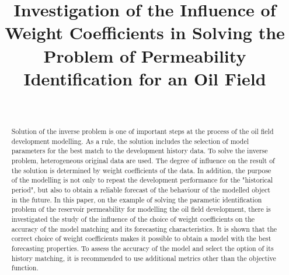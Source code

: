 \documentclass[
11pt,%
tightenlines,%
twoside,%
onecolumn,%
nofloats,%
nobibnotes,%
nofootinbib,%
superscriptaddress,%
noshowpacs,%
centertags]%
{revtex4}
\begin{document}

\title{Investigation of the Influence of Weight Coefficients in Solving
the Problem of Permeability Identification for an Oil Field}

\author{~}
 






\begin{abstract} %
Solution of the inverse problem is one of important steps at the process of the oil field development modelling. As a rule, the solution includes the selection of model parameters for the best match to the development history data. To solve the inverse problem, heterogeneous original data are used. The degree of influence on the result of the solution is determined by weight coefficients of the data. In addition, the purpose of the modelling is not only to repeat the development performance for the "historical period", but also to obtain a reliable forecast of the behaviour of the modelled object in the future. In this paper, on the example of solving the parametic identification problem of the reservoir permeability for modelling the oil field development, there is investigated the study of the influence of the choice of weight coefficients on the accuracy of the model matching and its forecasting characteristics. It
is shown that the correct choice of weight coefficients makes it
possible to obtain a model with the best forecasting properties. To
assess the accuracy of the model and select the option of its
history matching, it is recommended to use additional metrics other
than the objective function.
\end{abstract}
\end{document}

